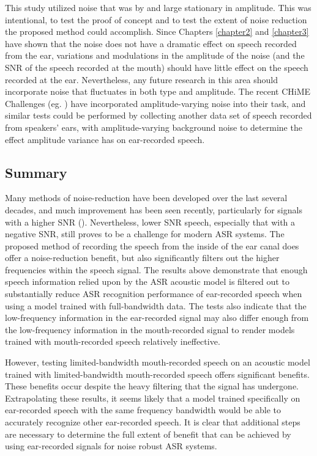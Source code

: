 This study utilized noise that was by and large stationary in amplitude.  This was intentional, to test the proof of concept and to test the extent of noise reduction the proposed method could accomplish.  Since Chapters \ref{chapter2} and \ref{chapter3} have shown that the noise does not have a dramatic effect on speech recorded from the ear, variations and modulations in the amplitude of the noise (and the SNR of the speech recorded at the mouth) should have little effect on the speech recorded at the ear.  Nevertheless, any future research in this area should incorporate noise that fluctuates in both type and amplitude.  The recent CHiME Challenges (eg. \cite{chime:16}) have incorporated amplitude-varying noise into their task, and similar tests could be performed by collecting another data set of speech recorded from speakers' ears, with amplitude-varying background noise to determine the effect amplitude variance has on ear-recorded speech.

\subsection{Summary}
\label{chap4:summary}

Many methods of noise-reduction have been developed over the last several decades, and much improvement has been seen recently, particularly for signals with a higher SNR (\cite{zhang:17}).  Nevertheless, lower SNR speech, especially that with a negative SNR, still proves to be a challenge for modern ASR systems.  The proposed method of recording the speech from the inside of the ear canal does offer a noise-reduction benefit, but also significantly filters out the higher frequencies within the speech signal.  The results above demonstrate that enough speech information relied upon by the ASR acoustic model is filtered out to substantially reduce ASR recognition performance of ear-recorded speech when using a model trained with full-bandwidth data.  The tests also indicate that the low-frequency information in the ear-recorded signal may also differ enough from the low-frequency information in the mouth-recorded signal to render models trained with mouth-recorded speech relatively ineffective.  

However, testing limited-bandwidth mouth-recorded speech on an acoustic model trained with limited-bandwidth mouth-recorded speech offers significant benefits.  These benefits occur despite the heavy filtering that the signal has undergone.  Extrapolating these results, it seems likely that a model trained specifically on ear-recorded speech with the same frequency bandwidth would be able to accurately recognize other ear-recorded speech.  It is clear that additional steps are necessary to determine the full extent of benefit that can be achieved by using ear-recorded signals for noise robust ASR systems.


